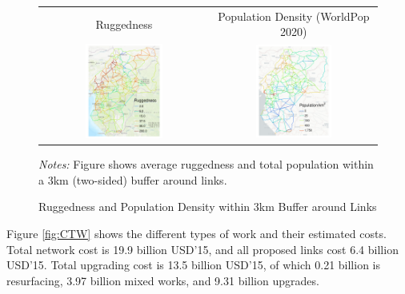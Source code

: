 \documentclass[a4paper]{article}
\begin{document}
\begin{figure}[H] \vspace{-1mm}
\centering
\caption{\label{fig:RUGG_POP} Ruggedness and Population Density within 3km Buffer around Links}
\vspace{2mm}
\begin{tabular}{cc}
Ruggedness \citep{nunn2012ruggedness} & Population Density (WorldPop 2020) \\
\includegraphics[width=0.48\textwidth]{"../figures/trans_CEMAC_network_rugg.pdf"} &
\includegraphics[width=0.48\textwidth]{"../figures/trans_CEMAC_network_pop_wpop_km2.pdf"} \\ [-0.2em]
\end{tabular}
\scriptsize 
\emph{Notes:} Figure shows average ruggedness and total population within a 3km (two-sided) buffer around links.
\end{figure}


Figure \ref{fig:CTW} shows the different types of work and their estimated costs. Total network cost is 19.9 billion USD'15, and all proposed links cost 6.4 billion USD'15. Total upgrading cost is 13.5 billion USD'15, of which 0.21 billion is resurfacing, 3.97 billion mixed works, and 9.31 billion upgrades. 
\end{document}
